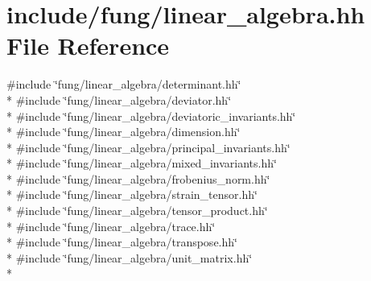\hypertarget{linear__algebra_8hh}{}\section{include/fung/linear\+\_\+algebra.hh File Reference}
\label{linear__algebra_8hh}
{\ttfamily \#include \char`\"{}fung/linear\+\_\+algebra/determinant.\+hh\char`\"{}}\\*
{\ttfamily \#include \char`\"{}fung/linear\+\_\+algebra/deviator.\+hh\char`\"{}}\\*
{\ttfamily \#include \char`\"{}fung/linear\+\_\+algebra/deviatoric\+\_\+invariants.\+hh\char`\"{}}\\*
{\ttfamily \#include \char`\"{}fung/linear\+\_\+algebra/dimension.\+hh\char`\"{}}\\*
{\ttfamily \#include \char`\"{}fung/linear\+\_\+algebra/principal\+\_\+invariants.\+hh\char`\"{}}\\*
{\ttfamily \#include \char`\"{}fung/linear\+\_\+algebra/mixed\+\_\+invariants.\+hh\char`\"{}}\\*
{\ttfamily \#include \char`\"{}fung/linear\+\_\+algebra/frobenius\+\_\+norm.\+hh\char`\"{}}\\*
{\ttfamily \#include \char`\"{}fung/linear\+\_\+algebra/strain\+\_\+tensor.\+hh\char`\"{}}\\*
{\ttfamily \#include \char`\"{}fung/linear\+\_\+algebra/tensor\+\_\+product.\+hh\char`\"{}}\\*
{\ttfamily \#include \char`\"{}fung/linear\+\_\+algebra/trace.\+hh\char`\"{}}\\*
{\ttfamily \#include \char`\"{}fung/linear\+\_\+algebra/transpose.\+hh\char`\"{}}\\*
{\ttfamily \#include \char`\"{}fung/linear\+\_\+algebra/unit\+\_\+matrix.\+hh\char`\"{}}\\*
